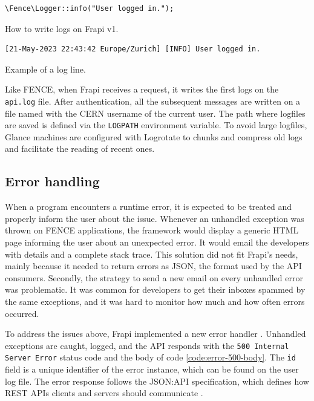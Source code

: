 \begin{listing}[htbp]
\begin{verbatim}
\Fence\Logger::info("User logged in.");
\end{verbatim}
\caption{How to write logs on Frapi v1.}
\label{code:logger-php-example}
\end{listing}

\begin{listing}[htbp]
\begin{verbatim}
[21-May-2023 22:43:42 Europe/Zurich] [INFO] User logged in.
\end{verbatim}
\caption{Example of a log line.}
\label{code:log-line-example}
\end{listing}

Like FENCE, when Frapi receives a request, it writes the first logs on the \texttt{api.log} file. After authentication, all the subsequent messages are written on a file named with the CERN username of the current user. The path where logfiles are saved is defined via the \texttt{LOG\textunderscore PATH} environment variable. To avoid large logfiles, Glance machines are configured with Logrotate \cite{logrotate-man} to chunks and compress old logs and facilitate the reading of recent ones.

\subsection{Error handling}
\label{sec:error-handling}

When a program encounters a runtime error, it is expected to be treated and properly inform the user about the issue. Whenever an unhandled exception was thrown on FENCE applications, the framework would display a generic HTML page informing the user about an unexpected error. It would email the developers with details and a complete stack trace. This solution did not fit Frapi's needs, mainly because it needed to return errors as JSON, the format used by the API consumers. Secondly, the strategy to send a new email on every unhandled error was problematic. It was common for developers to get their inboxes spammed by the same exceptions, and it was hard to monitor how much and how often errors occurred.

To address the issues above, Frapi implemented a new error handler \cite{frapi-error-handler-doc}. Unhandled exceptions are caught, logged, and the API responds with the \texttt{500 Internal Server Error} status code and the body of code \autoref{code:error-500-body}. The \texttt{id} field is a unique identifier of the error instance, which can be found on the user log file. The error response follows the JSON:API specification, which defines how REST APIs clients and servers should communicate \cite{json-api-intro} \cite{json-api-error} \cite{json-api-error-example}.

